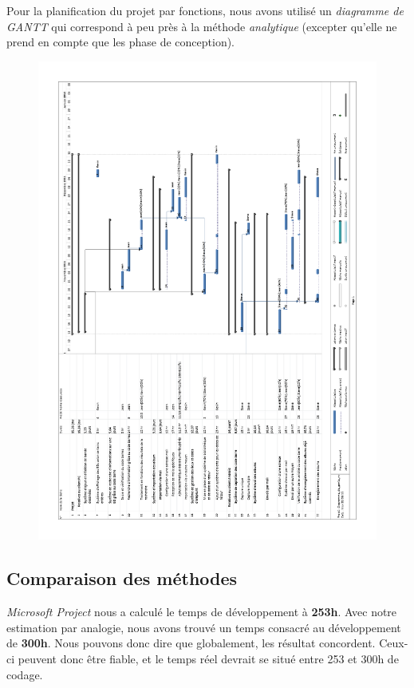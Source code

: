 Pour la planification du projet par fonctions, nous avons utilisé un \emph{diagramme de GANTT} qui correspond à peu près à la méthode \emph{analytique} (excepter qu'elle ne prend en compte que les phase de conception).
\begin{figure}
\includegraphics[width=15cm]{../Diagramme_gante.png}
\end{figure}
\clearpage

\subsection{Comparaison des méthodes}
\emph{Microsoft Project} nous a calculé le temps de développement à \textbf{253h}. 
Avec notre estimation par analogie, nous avons trouvé un temps consacré au développement de \textbf{300h}. 
Nous pouvons donc dire que globalement, les résultat concordent. 
Ceux-ci peuvent donc être fiable, et le temps réel devrait se situé entre 253 et 300h de codage. 

